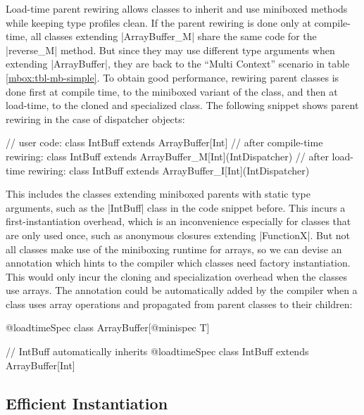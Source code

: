 Load-time parent rewiring allows classes to inherit and use miniboxed methods while keeping type profiles clean. If the parent rewiring is done only at compile-time, all classes extending |ArrayBuffer_M| share the same code for the |reverse_M| method. But since they may use different type arguments when extending |ArrayBuffer|, they are back to the ``Multi Context'' scenario in table \ref{mbox:tbl-mb-simple}. To obtain good performance, rewiring parent classes is done first at compile time, to the miniboxed variant of the class, and then at load-time, to the cloned and specialized class. The following snippet shows parent rewiring in the case of dispatcher objects:

\begin{lstlisting-nobreak}
 // user code:
 class IntBuff extends ArrayBuffer[Int]
 // after compile-time rewiring:
 class IntBuff extends ArrayBuffer_M[Int](IntDispatcher)
 // after load-time rewiring:
 class IntBuff extends ArrayBuffer_I[Int](IntDispatcher)
\end{lstlisting-nobreak}

 This includes the classes extending miniboxed parents with static type arguments, such as the |IntBuff| class in the code snippet before. This incurs a first-instantiation overhead, which is an inconvenience especially for classes that are only used once, such as anonymous closures extending |FunctionX|. But not all classes make use of the miniboxing runtime for arrays, so we can devise an annotation which hints to the compiler which classes need factory instantiation. This would only incur the cloning and specialization overhead when the classes use arrays. The annotation could be automatically added by the compiler when a class uses array operations and propagated from parent classes to their children:

\begin{lstlisting-nobreak}
 @loadtimeSpec
 class ArrayBuffer[@minispec T]

 // IntBuff automatically inherits @loadtimeSpec
 class IntBuff extends ArrayBuffer[Int]
\end{lstlisting-nobreak}

\subsection{Efficient Instantiation}
\label{mbox:subsec-runtime-instantiation}

